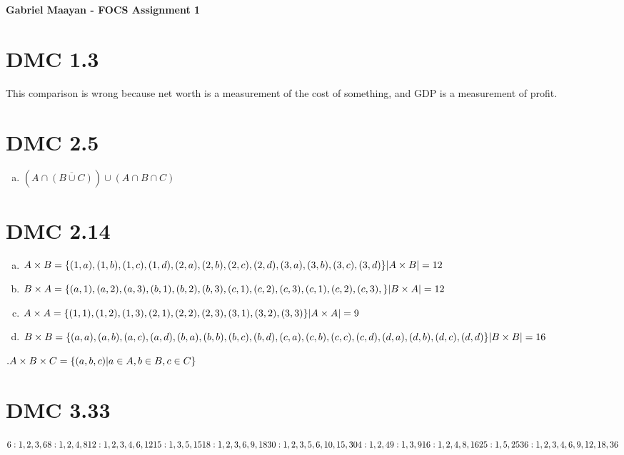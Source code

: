 \documentclass[]{article}
\def\math#1{$#1$}
\begin{document}
\bf \Large Gabriel Maayan - FOCS Assignment 1

\section{DMC 1.3}
This comparison is wrong because net worth is a measurement of the cost of something, and GDP is a measurement of profit.
\section{DMC 2.5}
\begin{enumerate}[(b)]
\item \math{(A\cap\overline{(B\cup C)})\cup (A\cap B\cap C)}
\end{enumerate}

\section{DMC 2.14}
\begin{enumerate}[(a)]
\item \math{A\times B = \{ (1, a), (1, b), (1, c), (1, d), 
(2, a), (2, b), (2, c), (2, d),\newline (3, a), (3, b), (3, c), (3, d)\} 
\newline |A\times B| = 12 }
\item \math{B\times A = \{ (a, 1), (a, 2), (a, 3), (b, 1), (b, 2), (b, 3), 
\newline (c, 1), (c, 2), (c, 3), (c, 1), (c, 2), (c, 3), \} 
\newline |B\times A| = 12 }
\item \math{A\times A = \{ (1, 1), (1, 2), (1, 3), (2, 1), (2, 2), (2, 3), 
\newline (3, 1), (3, 2), (3, 3)\}
\newline |A\times A| = 9}
\item \math{B\times B = \{(a, a), (a, b), (a, c), (a, d), (b, a), (b, b), (b, c), (b, d), 
\newline (c, a), (c, b), (c, c), (c, d), (d, a), (d, b), (d, c), (d, d)\}
\newline |B\times B| = 16}
\end{enumerate}

\math{\\
.A\times B\times C = \{(a, b, c)  |  a\in A, b\in B, c \in C\}}

\section{DMC 3.33}
\math{
6: 1, 2, 3, 6
\newline 8: 1, 2, 4, 8
\newline 12: 1, 2, 3, 4, 6, 12
\newline 15: 1, 3, 5, 15
\newline 18: 1, 2, 3, 6, 9, 18
\newline 30: 1, 2, 3, 5, 6, 10, 15, 30
\newline 4: 1, 2, 4
\newline 9: 1, 3, 9
\newline 16: 1, 2, 4, 8, 16
\newline 25: 1, 5, 25
\newline 36: 1, 2, 3, 4, 6, 9, 12, 18, 36}
\end{document}
